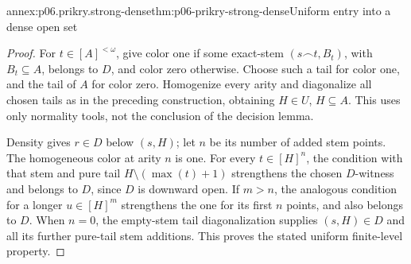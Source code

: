\begin{annexitem}{annex:p06.prikry.strong-dense}{thm:p06-prikry-strong-dense}{Uniform entry into a dense open set}
\begin{proof}
For \(t\in[A]^{<\omega}\), give color one if some exact-stem
\((s\mathbin{\frown}t,B_t)\), with \(B_t\subseteq A\), belongs
to \(D\), and color zero otherwise. Choose such a tail for color one,
and the tail of \(A\) for color zero. Homogenize every arity and
diagonalize all chosen tails as in the preceding construction, obtaining
\(H\in U\), \(H\subseteq A\). This uses only normality tools, not
the conclusion of the decision lemma.

Density gives \(r\in D\) below \((s,H)\); let \(n\) be its number
of added stem points. The homogeneous color at arity \(n\) is one.
For every \(t\in[H]^n\), the condition with that stem and pure tail
\(H\setminus(\max(t)+1)\) strengthens the chosen \(D\)-witness
and belongs to \(D\), since \(D\) is downward open. If \(m>n\),
the analogous condition for a longer \(u\in[H]^m\) strengthens the
one for its first \(n\) points, and also belongs to \(D\). When
\(n=0\), the empty-stem tail diagonalization supplies \((s,H)\in D\)
and all its further pure-tail stem additions. This proves the stated
uniform finite-level property.
\end{proof}
\end{annexitem}

